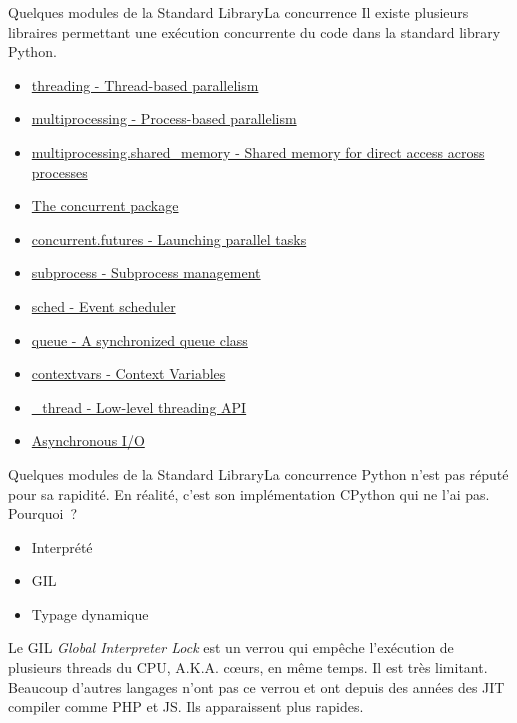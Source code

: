 \documentclass{beamer}
\begin{document}
    \begin{frame}{Quelques modules de la Standard Library}{La concurrence}
        Il existe plusieurs libraires permettant une exécution concurrente du code dans la standard library Python.
        \begin{itemize}
            \item \href{https://docs.python.org/3/library/threading.html}{threading - Thread-based parallelism}
            \item \href{https://docs.python.org/3/library/multiprocessing.html}{multiprocessing - Process-based parallelism}
            \item \href{https://docs.python.org/3/library/multiprocessing.shared_memory.html}{multiprocessing.shared\_memory - Shared memory for direct access across processes}
            \item \href{https://docs.python.org/3/library/concurrent.html}{The concurrent package}
            \item \href{https://docs.python.org/3/library/concurrent.futures.html}{concurrent.futures - Launching parallel tasks}
            \item \href{https://docs.python.org/3/library/subprocess.html}{subprocess - Subprocess management}
            \item \href{https://docs.python.org/3/library/sched.html}{sched - Event scheduler}
            \item \href{https://docs.python.org/3/library/queue.html}{queue - A synchronized queue class}
            \item \href{https://docs.python.org/3/library/contextvars.html}{contextvars - Context Variables}
            \item \href{https://docs.python.org/3/library/\_thread.html}{\_thread - Low-level threading API}
            \item \href{https://docs.python.org/3/library/asyncio.html}{Asynchronous I/O}
        \end{itemize}
    \end{frame}

    \begin{frame}{Quelques modules de la Standard Library}{La concurrence}
        Python n'est pas réputé pour sa rapidité.
        En réalité, c'est son implémentation CPython qui ne l'ai pas.
        \bigbreak
        Pourquoi~?
        \pause
        \begin{itemize}
            \item Interprété
            \item GIL
            \item Typage dynamique
        \end{itemize}
        Le GIL \textit{Global Interpreter Lock} est un verrou qui empêche l'exécution de plusieurs threads du CPU, A.K.A. cœurs, en même temps.
        Il est très limitant.
        Beaucoup d'autres langages n'ont pas ce verrou et ont depuis des années des JIT compiler comme PHP et JS.
        Ils apparaissent plus rapides.
    \end{frame}
\end{document}
